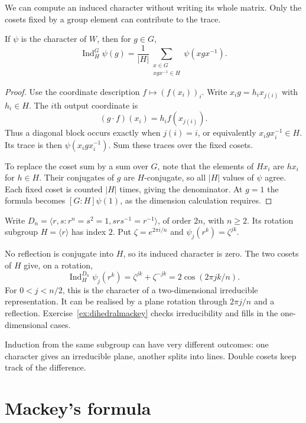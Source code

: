 We can compute an induced character without writing its whole matrix. Only the cosets fixed by a group element can contribute to the trace.

\begin{proposition}\label{prop:indchar}
If $\psi$ is the character of $W$, then for $g\in G$,
\[
\operatorname{Ind}_H^G\psi(g)
=\frac1{|H|}\sum_{\substack{x\in G\\xgx^{-1}\in H}}
\psi(xgx^{-1}).
\]
\end{proposition}

\begin{proof}
Use the coordinate description $f\mapsto(f(x_i))_i$. Write $x_ig=h_ix_{j(i)}$ with $h_i\in H$. The $i$th output coordinate is
\[
(g\cdot f)(x_i)=h_i f(x_{j(i)}).
\]
Thus a diagonal block occurs exactly when $j(i)=i$, or equivalently $x_igx_i^{-1}\in H$. Its trace is then $\psi(x_igx_i^{-1})$. Sum these traces over the fixed cosets.

To replace the coset sum by a sum over $G$, note that the elements of $Hx_i$ are $hx_i$ for $h\in H$. Their conjugates of $g$ are $H$-conjugate, so all $|H|$ values of $\psi$ agree. Each fixed coset is counted $|H|$ times, giving the denominator. At $g=1$ the formula becomes $[G:H]\psi(1)$, as the dimension calculation requires.
\end{proof}

\begin{example}\label{ex:dihedral}
Write $D_n=\langle r,s:r^n=s^2=1, srs^{-1}=r^{-1}\rangle$, of order $2n$, with $n\ge2$. Its rotation subgroup $H=\langle r\rangle$ has index $2$. Put $\zeta=e^{2\pi i/n}$ and $\psi_j(r^k)=\zeta^{jk}$.

No reflection is conjugate into $H$, so its induced character is zero. The two cosets of $H$ give, on a rotation,
\[
\operatorname{Ind}_H^{D_n}\psi_j(r^k)
=\zeta^{jk}+\zeta^{-jk}=2\cos(2\pi jk/n).
\]
For $0<j<n/2$, this is the character of a two-dimensional irreducible representation. It can be realised by a plane rotation through $2\pi j/n$ and a reflection. Exercise~\ref{ex:dihedralmackey} checks irreducibility and fills in the one-dimensional cases.
\end{example}

Induction from the same subgroup can have very different outcomes: one character gives an irreducible plane, another splits into lines. Double cosets keep track of the difference.

\section{Mackey's formula}

